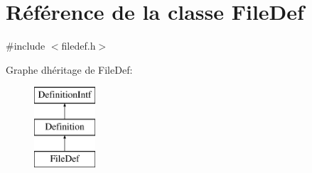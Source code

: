 \hypertarget{class_file_def}{}\section{Référence de la classe File\+Def}
\label{class_file_def}


{\ttfamily \#include $<$filedef.\+h$>$}

Graphe d\textquotesingle{}héritage de File\+Def\+:\begin{figure}[H]
\begin{center}
\leavevmode
\includegraphics[height=3.000000cm]{class_file_def}
\end{center}
\end{figure}
